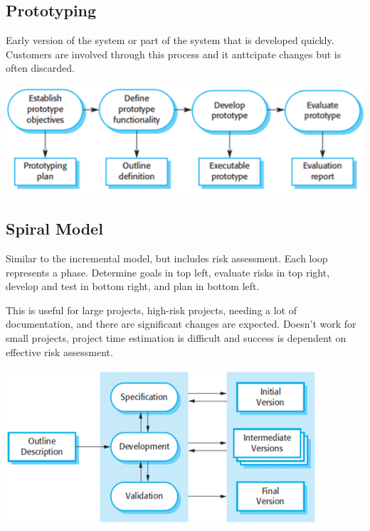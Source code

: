 \documentclass{article}
\begin{document}
    \subsection*{Prototyping}

    Early version of the system or part of the system that is developed quickly. 
    Customers are involved through this process and it anttcipate changes but is often 
    discarded.

    \begin{center}
        \includegraphics[scale=0.7]{Prototyping.png}
    \end{center}

    \subsection*{Spiral Model}

    Similar to the incremental model, but includes risk assessment. Each loop represents a 
    phase. Determine goals in top left, evaluate risks in top right, develop and test in 
    bottom right, and plan in bottom left.

    This is useful for large projects, high-risk projects, needing a lot of documentation,
    and there are significant changes are expected. Doesn't work for small projects, project 
    time estimation is difficult and success is dependent on effective risk assessment.

    \begin{center}
        \includegraphics[scale=0.7]{IncrementalModel.png}
    \end{center}
\end{document}
